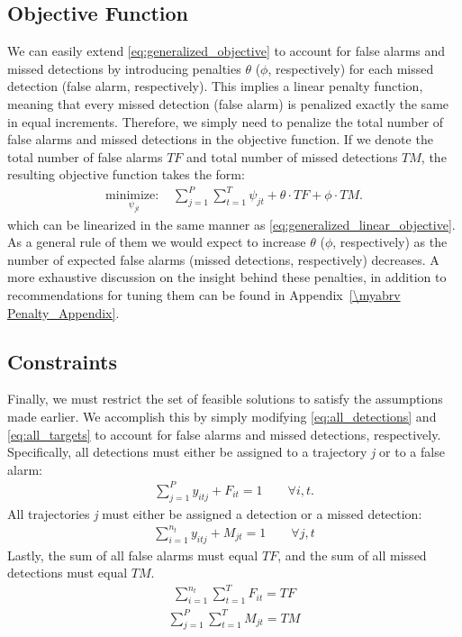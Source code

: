 \subsection{Objective Function}
We can easily extend \eqref{eq:generalized_objective} to account for false alarms and missed detections by introducing penalties $\theta$ ($\phi$, respectively) for each missed detection (false alarm, respectively). This implies a linear penalty function, meaning that every missed detection (false alarm) is penalized exactly the same in equal increments. Therefore, we simply need to penalize the total number of false alarms and missed detections in the objective function. If we denote the total number of false alarms $TF$ and total number of missed detections $TM$, the resulting objective function takes the form:
\begin{align*}
\underset{\psi_{jt}}{\text{minimize: }} & \sum_{j=1}^{P} \sum_{t=1}^{T} \psi_{jt} + \theta \cdot TF + \phi \cdot TM.
\end{align*}
which can be linearized in the same manner as \eqref{eq:generalized_linear_objective}. As a general rule of them we would expect to increase $\theta$ ($\phi$, respectively) as the number of expected false alarms (missed detections, respectively) decreases. A more exhaustive discussion on the insight behind these penalties, in addition to recommendations for tuning them can be found in Appendix~\ref{\myabrv Penalty_Appendix}.

\subsection{Constraints}
Finally, we must restrict the set of feasible solutions to satisfy the assumptions made earlier. We accomplish this by simply modifying \eqref{eq:all_detections} and \eqref{eq:all_targets} to account for false alarms and missed detections, respectively. Specifically, all detections must either be assigned to a trajectory \textit{j} or to a false alarm:
\begin{align}\label{eqn: FA Simple}
\sum_{j=1}^{P} y_{itj} + F_{it} = 1 \qquad \forall i,t.
\end{align}
All trajectories \textit{j} must either be assigned a detection or a missed detection:
\begin{align}
\sum_{i=1}^{n_{t}} y_{itj} + M_{jt} = 1 \qquad \forall j,t
\end{align}
Lastly, the sum of all false alarms must equal $TF$, and the sum of all missed detections must equal $TM$. 
\begin{align*}
\sum_{i=1}^{n_{t}} \sum_{t=1}^{T} F_{it} = TF
\end{align*}
\begin{align}\label{eqn: MD Total}
\sum_{j=1}^{P} \sum_{t=1}^{T} M_{jt} = TM 
\end{align}


